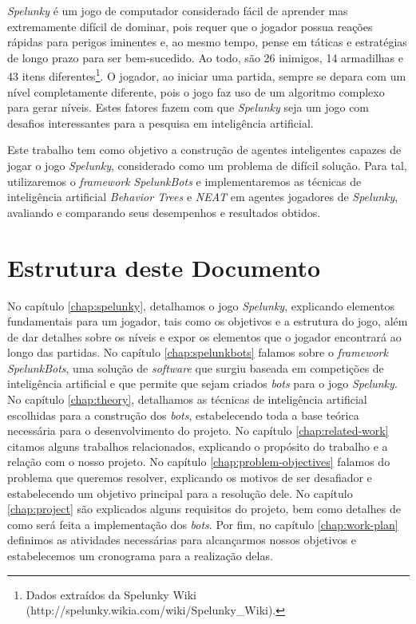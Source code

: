 \textit{Spelunky} é um jogo de computador considerado fácil de aprender mas
extremamente difícil de dominar, pois requer que o jogador possua reações
rápidas para perigos iminentes e, ao mesmo tempo, pense em táticas e estratégias
de longo prazo para ser bem-sucedido. Ao todo, são 26 inimigos, 14 armadilhas e
43 itens diferentes\footnote{Dados extraídos da Spelunky Wiki
(http://spelunky.wikia.com/wiki/Spelunky\_Wiki).}. O jogador, ao iniciar uma
partida, sempre se depara com um nível completamente diferente, pois o jogo faz
uso de um algoritmo complexo para gerar níveis. Estes fatores fazem com que
\textit{Spelunky} seja um jogo com desafios interessantes para a pesquisa em
inteligência artificial.

Este trabalho tem como objetivo a construção de agentes inteligentes capazes de
jogar o jogo \textit{Spelunky}, considerado como um problema de difícil solução.
Para tal, utilizaremos o \textit{framework} \textit{SpelunkBots} e
implementaremos as técnicas de inteligência artificial \textit{Behavior Trees} e
\textit{NEAT} em agentes jogadores de \textit{Spelunky}, avaliando e comparando
seus desempenhos e resultados obtidos.


\section{\label{section:document-structure}Estrutura deste Documento}
No capítulo \ref{chap:spelunky}, detalhamos o jogo \textit{Spelunky},
explicando elementos fundamentais para um jogador, tais como os objetivos e a
estrutura do jogo, além de dar detalhes sobre os níveis e expor os elementos
que o jogador encontrará ao longo das partidas.
No capítulo \ref{chap:spelunkbots} falamos sobre o \textit{framework}
\textit{SpelunkBots}, uma solução de \textit{software} que surgiu baseada em
competições de inteligência artificial e que permite que sejam criados
\textit{bots} para o jogo \textit{Spelunky}.
No capítulo \ref{chap:theory}, detalhamos as técnicas de inteligência
artificial escolhidas para a construção dos \textit{bots}, estabelecendo toda a
base teórica necessária para o desenvolvimento do projeto.
No capítulo \ref{chap:related-work} citamos alguns trabalhos relacionados,
explicando o propósito do trabalho e a relação com o nosso projeto.
No capítulo \ref{chap:problem-objectives} falamos do problema que queremos
resolver, explicando os motivos de ser desafiador e estabelecendo um objetivo
principal para a resolução dele.
No capítulo \ref{chap:project} são explicados alguns requisitos do projeto,
bem como detalhes de como será feita a implementação dos \textit{bots}.
Por fim, no capítulo \ref{chap:work-plan} definimos as atividades
necessárias para alcançarmos nossos objetivos e estabelecemos um cronograma
para a realização delas.
